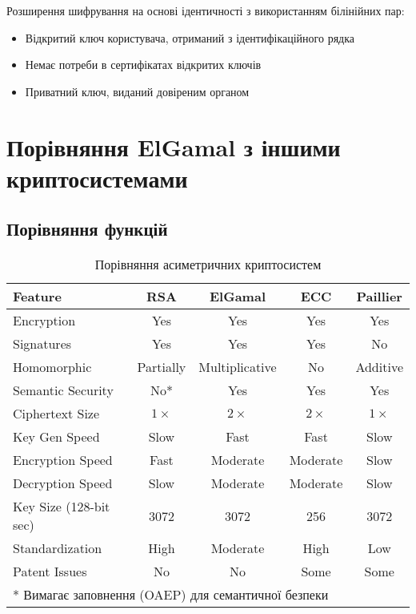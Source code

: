 Розширення шифрування на основі ідентичності з використанням білінійних пар:
\begin{itemize}
    \item Відкритий ключ користувача, отриманий з ідентифікаційного рядка
    \item Немає потреби в сертифікатах відкритих ключів
    \item Приватний ключ, виданий довіреним органом
\end{itemize}

\section{Порівняння ElGamal з іншими криптосистемами}

\subsection{Порівняння функцій}

\begin{table}[ht]
    \centering
    \small
    \begin{tabular}{|l|c|c|c|c|}
        \hline
        \textbf{Feature}       & \textbf{RSA} & \textbf{ElGamal} & \textbf{ECC} & \textbf{Paillier} \\
        \hline
        Encryption             & Yes          & Yes              & Yes          & Yes               \\
        Signatures             & Yes          & Yes              & Yes          & No                \\
        Homomorphic            & Partially    & Multiplicative   & No           & Additive          \\
        Semantic Security      & No*          & Yes              & Yes          & Yes               \\
        Ciphertext Size        & $1 \times$   & $2 \times$       & $2 \times$   & $1 \times$        \\
        Key Gen Speed          & Slow         & Fast             & Fast         & Slow              \\
        Encryption Speed       & Fast         & Moderate         & Moderate     & Slow              \\
        Decryption Speed       & Slow         & Moderate         & Moderate     & Slow              \\
        Key Size (128-bit sec) & 3072         & 3072             & 256          & 3072              \\
        Standardization        & High         & Moderate         & High         & Low               \\
        Patent Issues          & No           & No               & Some         & Some              \\
        \hline
        \multicolumn{5}{l}{* Вимагає заповнення (OAEP) для семантичної безпеки}
    \end{tabular}
    \caption{Порівняння асиметричних криптосистем}
\end{table}

